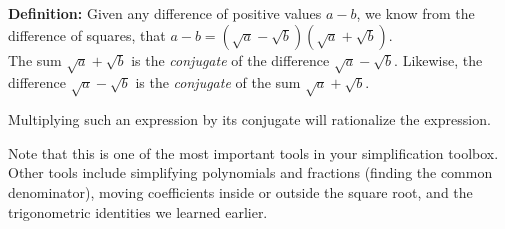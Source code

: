 \documentclass{ximera}
\begin{document}
\begin{callout}
  {\bf Definition:} 
  Given any difference of positive values $a-b$, we know from the difference of squares, that $a-b = (\sqrt{a}-\sqrt{b})(\sqrt{a}+\sqrt{b})$. \\
  The sum $\sqrt{a}+\sqrt{b}$ is the {\it conjugate} of the difference $\sqrt{a}-\sqrt{b}$.
  Likewise, the difference $\sqrt{a}-\sqrt{b}$ is the {\it conjugate} of the sum $\sqrt{a}+\sqrt{b}$.
 
 Multiplying such an expression by its conjugate will rationalize the expression.
  \end{callout}
%
Note that this is one of the most important tools in your simplification toolbox. Other tools include simplifying polynomials and fractions (finding the common denominator), moving coefficients inside or outside the square root, and the trigonometric identities we learned earlier.
\end{document}
